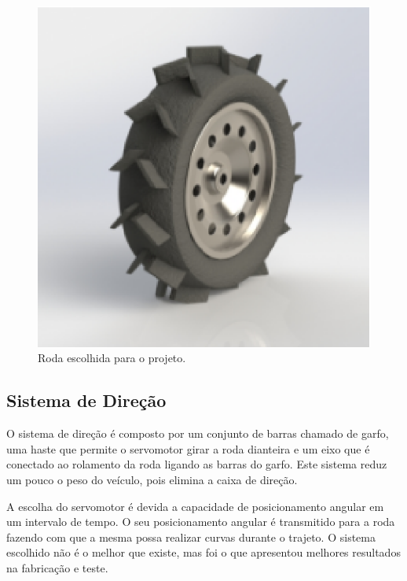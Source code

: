   \begin{figure}[!htbp]
  \begin{center}
  \includegraphics[keepaspectratio=true,scale=0.5]{figuras/wheel.eps}
  \caption{\label{WHEEL}Roda escolhida para o projeto.}
  \end{center}
  \end{figure}

  \newpage
  \vfill
  \pagebreak

  \subsection{Sistema de Direção}
    O sistema de direção é composto por um conjunto de barras chamado de garfo, uma haste que permite o servomotor girar a roda dianteira e um eixo que é conectado ao rolamento da roda ligando as barras do garfo. Este sistema reduz um pouco o peso do veículo, pois elimina a caixa de direção.
     
    A escolha do servomotor é devida a capacidade de posicionamento angular em um intervalo de tempo. O seu posicionamento angular é transmitido para a roda fazendo com que a mesma possa realizar curvas durante o trajeto. O sistema escolhido não é o melhor que existe, mas foi o que apresentou melhores resultados na fabricação e teste.
    

